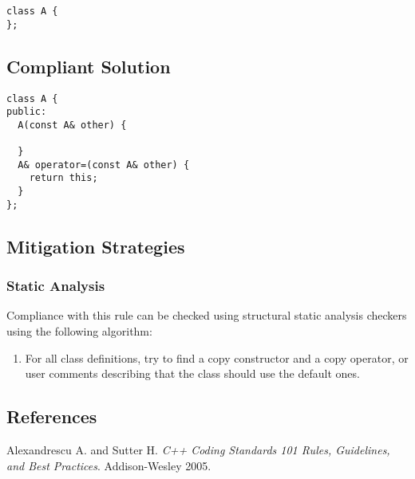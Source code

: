\begin{verbatim}
class A {
};
\end{verbatim}

\subsection{Compliant Solution}

\begin{verbatim}
class A {
public:
  A(const A& other) {

  }
  A& operator=(const A& other) {
    return this;
  }
};
\end{verbatim}

\subsection{Mitigation Strategies}
\subsubsection{Static Analysis}

Compliance with this rule can be checked using structural static
analysis checkers using the following algorithm:

\begin{enumerate}
\item For all class definitions, try to find a copy constructor
and a copy operator, or user comments describing that the class should
use the default ones.
\end{enumerate}

\subsection{References}

Alexandrescu A. and Sutter H. {\it C++ Coding Standards 101 Rules, Guidelines, and Best Practices}. Addison-Wesley 2005.
